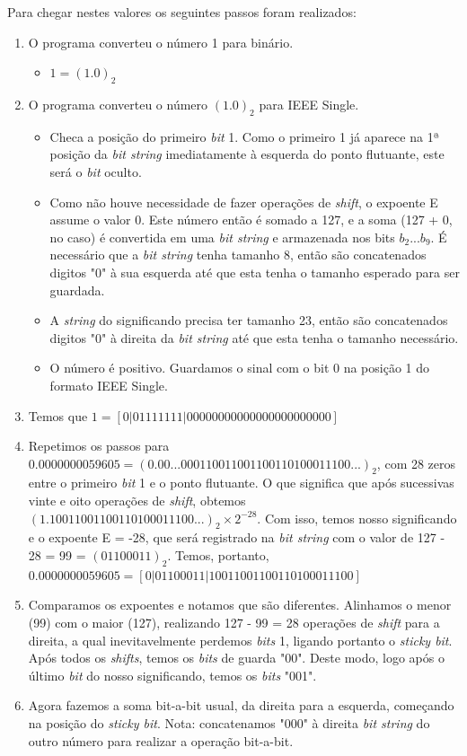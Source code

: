 \documentclass[11pt]{article}
\begin{document}
Para chegar nestes valores os seguintes passos foram realizados:
\begin{enumerate}
  \item O programa converteu o número 1 para binário.
    \begin{itemize}
      \item  $ 1 = (1.0)_2 $
    \end{itemize}
  \item O programa converteu o número $(1.0)_2$ para IEEE Single.
  \begin{itemize}
    \item Checa a posição do primeiro \textit{bit} 1. Como o primeiro 1 já aparece na 1ª posição da \textit{bit string} imediatamente à esquerda do ponto flutuante, este será o \textit{bit} oculto.
    \item Como não houve necessidade de fazer operações de \textit{shift}, o expoente E assume o valor 0. Este número então é somado a 127, e a soma (127 + 0, no caso)
    é convertida em uma \textit{bit string} e armazenada nos bits $b_2 ... b_9$. É necessário que a \textit{bit string} tenha tamanho 8, então são concatenados digitos "0"
    à sua esquerda até que esta tenha o tamanho esperado para ser guardada.
    \item A \textit{string} do significando precisa ter tamanho 23, então são concatenados digitos "0" à direita da \textit{bit string} até que esta tenha
    o tamanho necessário.
    \item O número é positivo. Guardamos o sinal com o bit 0 na posição 1 do formato IEEE Single.
  \end{itemize}
  \item Temos que {\small$1  = [ 0 | 0 1 1 1 1 1 1 1 | 0 0 0 0 0 0 0 0 0 0 0 0 0 0 0 0 0 0 0 0 0 0 0 ] $}
  \item Repetimos os passos para $0.0000000059605 = (0.00...000110011001100110100011100...)_2$, com 28 zeros entre o primeiro \textit{bit} 1 e o ponto flutuante. O que significa que após sucessivas vinte e oito operações
  de \textit{shift}, obtemos $ (1.10011001100110100011100...)_2 \times 2^{-28} $. Com isso, temos nosso significando e o expoente E = -28, que será registrado na \textit{bit string} com o valor de 127 - 28 = 99 = $ (01100011)_2 $.
  Temos, portanto, {\small$0.0000000059605 = [ 0 | 0 1 1 0 0 0 1 1 | 1 0 0 1 1 0 0 1 1 0 0 1 1 0 1 0 0 0 1 1 1 0 0 ] $}
  \item Comparamos os expoentes e notamos que são diferentes. Alinhamos o menor (99) com o maior (127), realizando 127 - 99 = 28 operações de \textit{shift} para a direita, a qual inevitavelmente perdemos \textit{bits} 1, ligando
  portanto o \textit{sticky bit}. Após todos os \textit{shifts}, temos os \textit{bits} de guarda "00". Deste modo, logo após o último \textit{bit} do nosso significando, temos os \textit{bits} "001".
  \item Agora fazemos a soma bit-a-bit usual, da direita para a esquerda, começando na posição do \textit{sticky bit}. Nota: concatenamos "000" à direita \textit{bit string} do outro número para realizar a operação bit-a-bit.


\end{enumerate}
\end{document}
